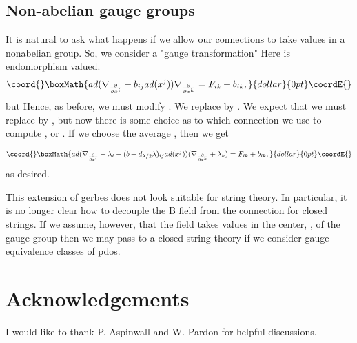 \documentclass[a4paper,11pt]{amsart}
\begin{document}
 
\subsection{Non-abelian gauge groups}
It is natural to ask what happens if we allow our connections to take values in
a nonabelian group. So, we consider a "gauge transformation" 
\coordHE{} 
Here \coordHE{} is endomorphism valued.
$$\coord{}\boxMath{ad(\nabla_{\frac{\partial}{\partial x^i}}
 - b_{ij}ad(x^j))\nabla_{\frac{\partial}{\partial x^k}} = F_{ik} + b_{ik},}{dollar}{0pt}\coordE{}$$
but 
\coordHE{} 
Hence, as before, we must modify \coordHE{}. We replace 
 \coordHE{} by 
\coordHE{}. We expect that we 
must replace 
\coordHE{} by \coordHE{}, but now there is some choice as to which connection we use to
compute \coordHE{}, \coordHE{} or \coordHE{}. If we choose the average 
\coordHE{}, then we get 

$$\coord{}\boxMath{ad(\nabla_{\frac{\partial}{\partial x^i}} + \lambda_i
 - (b+d_{\lambda/2}\lambda)_{ij}ad(x^j))(\nabla_{\frac{\partial}{\partial x^k}} + \lambda_k)
  = F_{ik} + b_{ik},}{dollar}{0pt}\coordE{}$$
  as desired. 
  
This extension of gerbes does not look suitable for string theory. In
particular, it is no longer clear how to decouple the B field from the
connection for closed strings. If we assume, however, that the \coordHE{} field takes
values in the center, \coordHE{}, of the gauge group then we may pass to a closed
 string theory if we consider \coordHE{} gauge equivalence classes of pdos.
 
    
\section{Acknowledgements}
I would like to thank P. Aspinwall and W. Pardon for helpful discussions.
\end{document}
